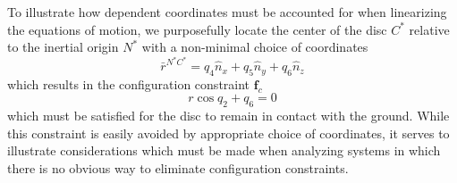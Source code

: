 \documentclass[smallcondensed,final]{svjour3}                     %
\begin{document}
To illustrate how dependent coordinates must be
accounted for when linearizing the equations of motion, we purposefully locate
the center of the disc $C^*$ relative to the inertial origin $N^*$ with a
non-minimal choice of coordinates
\begin{equation*}
  \bar{r}^{N^*C^*} = q_4 \hat{n}_x + q_5 \hat{n}_y + q_6 \hat{n}_z
\end{equation*}
which results in the configuration constraint $\mathbf{f}_c$
\begin{equation}
  \label{rd:f_c}
  r\cos{q_2} + q_6 = 0
\end{equation}
which must be satisfied for the disc to remain in contact with the ground.
While this constraint is easily avoided by appropriate choice of coordinates,
it serves to illustrate considerations which must be made when analyzing
systems in which there is no obvious way to eliminate configuration constraints.
\end{document}

